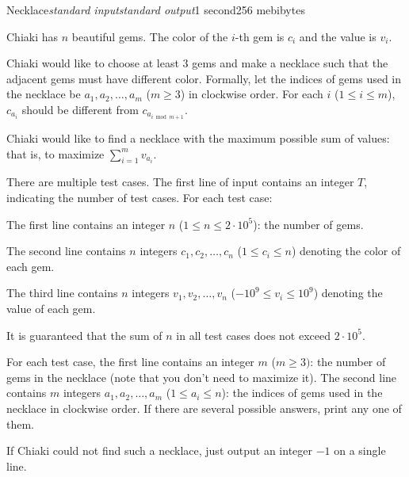 \begin{problem}{Necklace}{\textsl{standard input}}{\textsl{standard output}}{1 second}{256 mebibytes}

Chiaki has $n$ beautiful gems. The color of the $i$-th gem is $c_i$ and the value is $v_i$.

Chiaki would like to choose at least $3$ gems and make a necklace such that the adjacent gems must have different color. Formally, let the indices of gems used in the necklace be $a_1,a_2,\ldots,a_m$ ($m \ge 3$) in clockwise order. For each $i$ ($1 \le i \le m$), $c_{a_i}$ should be different from $c_{a_{i \bmod m + 1}}$.

Chiaki would like to find a necklace with the maximum possible sum of values: that is, to maximize $\sum\limits_{i=1}^{m} v_{a_i}$.

\InputFile
There are multiple test cases. The first line of input contains an integer $T$, indicating the number of test cases. For each test case:

The first line contains an integer $n$ ($1 \le n \le 2 \cdot 10^5$): the number of gems.

The second line contains $n$ integers $c_1,c_2,\ldots,c_n$ ($1 \le c_i \le n$) denoting the color of each gem.

The third line contains $n$ integers $v_1,v_2,\ldots,v_n$ ($-10^9 \le v_i \le 10^9$) denoting the value of each gem.

It is guaranteed that the sum of $n$ in all test cases does not exceed $2 \cdot 10^5$.


\OutputFile
For each test case, the first line contains an integer $m$ ($m \ge 3)$: the number of gems in the necklace (note that you don't need to maximize it). The second line contains $m$ integers $a_1,a_2,\ldots,a_m$ ($1 \le a_i \le n$): the indices of gems used in the necklace in clockwise order. If there are several possible answers, print any one of them.

If Chiaki could not find such a necklace, just output an integer $-1$ on a single line.




\Example

\begin{example}
%
\end{example}

\end{problem}
